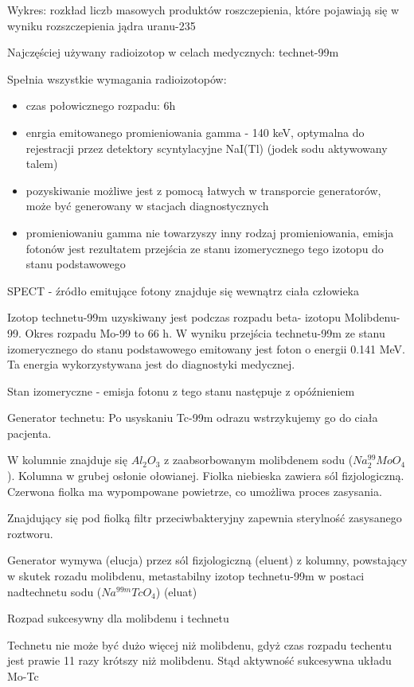 \documentclass{article}
\begin{document}
Wykres: rozkład liczb masowych produktów roszczepienia, które pojawiają się w wyniku rozszczepienia jądra uranu-235

Najczęściej używany radioizotop w celach medycznych: technet-99m

Spełnia wszystkie wymagania radioizotopów:
\begin{itemize}
    \item czas połowicznego rozpadu: 6h
    \item enrgia emitowanego promieniowania gamma - 140 keV, optymalna do rejestracji przez detektory scyntylacyjne NaI(Tl) (jodek sodu aktywowany talem)
    \item pozyskiwanie możliwe jest z pomocą łatwych w transporcie generatorów, może być generowany w stacjach diagnostycznych
    \item promieniowaniu gamma nie towarzyszy inny rodzaj promieniowania, emisja fotonów jest rezultatem przejścia ze stanu izomerycznego tego izotopu do stanu podstawowego
\end{itemize}

SPECT - źródło emitujące fotony znajduje się wewnątrz ciała człowieka

Izotop technetu-99m uzyskiwany jest podczas rozpadu beta- izotopu Molibdenu-99. Okres rozpadu Mo-99 to 66 h. W wyniku przejścia technetu-99m ze stanu izomerycznego do stanu podstawowego emitowany jest foton o energii 0.141 MeV. Ta energia wykorzystywana jest do diagnostyki medycznej.

Stan izomeryczne - emisja fotonu z tego stanu następuje z opóźnieniem

Generator technetu:
Po usyskaniu Tc-99m odrazu wstrzykujemy go do ciała pacjenta.

W kolumnie znajduje się $Al_2O_3$ z zaabsorbowanym molibdenem sodu ($Na_2^{99}MoO_4$). Kolumna w grubej osłonie ołowianej. Fiolka niebieska zawiera sól fizjologiczną. Czerwona fiolka ma wypompowane powietrze, co umożliwa proces zasysania.

Znajdujący się pod fiolką filtr przeciwbakteryjny zapewnia sterylność zasysanego roztworu.

Generator wymywa (elucja) przez sól fizjologiczną (eluent) z kolumny, powstający w skutek rozadu molibdenu, metastabilny izotop technetu-99m w postaci nadtechnetu sodu ($Na^{99m}TcO_4$) (eluat)

Rozpad sukcesywny dla molibdenu i technetu

Technetu nie może być dużo więcej niż molibdenu, gdyż czas rozpadu techentu jest prawie 11 razy krótszy niż molibdenu. Stąd aktywność sukcesywna układu Mo-Tc 
\end{document}
